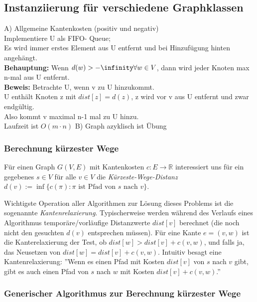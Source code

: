 \documentclass{article}
\begin{document}
\subsection{Instanziierung für verschiedene Graphklassen}
A) Allgemeine Kantenkosten (positiv und negativ) \\
Implementiere U als FIFO- Queue; \\
Es wird immer erstes Element aus U entfernt und bei Hinzufügung hinten angehängt. \\
\newline
\textbf{Behauptung: } Wenn $ d(w) > - \infinity  \forall w \in V$, dann wird jeder Knoten max n-mal aus U entfernt. \\
\newline
\textbf{Beweis: } Betrachte U, wenn v zu U hinzukommt. \\
U enthält Knoten z mit $dist[z] = d(z)$, z wird vor v aus U entfernt und zwar endgültig. \\
Also kommt v maximal n-1 mal zu U hinzu. \\
\Rightarrow Laufzeit ist $O(m \cdot n) $
\newline
B) Graph azyklisch ist Übung \\

\subsubsection{Berechnung kürzester Wege}


Für einen Graph $G(V,E)$ mit Kantenkosten $c:E\rightarrow \mathbb{R}$ interessiert uns für ein 
gegebenes $s\in V$ für alle $v\in V$ die \emph{Kürzeste-Wege-Distanz} $d(v):=\inf \{c(\pi): \pi \mbox{ ist Pfad von }s \mbox{ nach } v\}$.

Wichtigste Operation aller Algorithmen zur Lösung dieses Problems ist die sogenannte \emph{Kantenrelaxierung}. Typischerweise
werden während des Verlaufs eines Algorithmus temporäre/vorläufige Distanzwerte $dist[v]$ berechnet (die noch nicht den gesuchten $d(v)$ entsprechen
müssen). Für eine Kante $e=(v,w)$ ist die Kanterelaxierung der Test, ob $dist[w]>dist[v]+c(v,w)$, und falls ja, das Neusetzen von $dist[w]=dist[v]+c(v,w)$.
Intuitiv besagt eine Kantenrelaxierung: ''Wenn es einen Pfad mit Kosten $dist[v]$ von $s$ nach $v$ gibt, gibt es auch einen Pfad von $s$ nach $w$ mit
Kosten $dist[v]+c(v,w)$.''

\subsubsection{Generischer Algorithmus zur Berechnung kürzester Wege}
\end{document}
